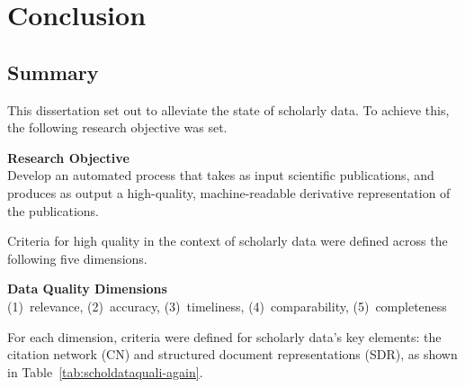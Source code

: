 \chapter{Conclusion}
\label{chp:conclusion}

\section{Summary}

This dissertation set out to alleviate the state of scholarly data. To achieve this, the following research objective was set.

\begin{infobox-objective}
\textbf{Research Objective}\\
Develop an automated process that takes as input scientific publications, and produces as output a high-quality, machine-readable derivative representation of the publications.
\end{infobox-objective}

Criteria for high quality in the context of scholarly data were defined across the following five dimensions.%

\begin{infobox-progress}
      \textbf{Data Quality Dimensions}\\
       (1)~relevance, (2)~accuracy, (3)~timeliness, (4)~comparability, (5)~completeness
\end{infobox-progress}

For each dimension, criteria were defined for scholarly data's key elements: the citation network (CN) and structured document representations (SDR), as shown in Table~\ref{tab:scholdataquali-again}.


